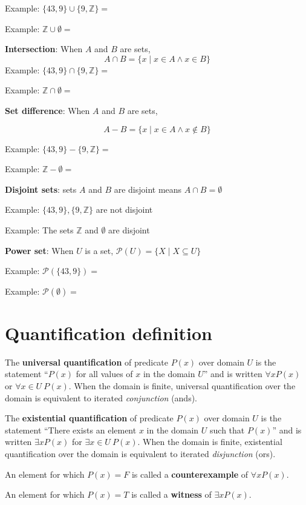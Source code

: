 \documentclass[12pt, oneside]{article}
\begin{document}
Example: $\{43, 9\} \cup \{9, \mathbb{Z}\}  = $

Example: $\mathbb{Z} \cup \emptyset  = $ 

{\bf Intersection}: When $A$ and  $B$ are sets,
\[
    A \cap  B = \{ x \mid x \in A  \wedge x \in B \}
\]    
Example: $\{43, 9\} \cap \{9,\mathbb{Z}\}  = $

Example: $\mathbb{Z} \cap \emptyset  = $


{\bf Set  difference}: When $A$ and  $B$ are sets,

\[
    A -  B = \{ x \mid x \in A  \wedge x \notin B \}
\]

Example: $\{43, 9\} - \{9, \mathbb{Z}\}  = $

Example: $\mathbb{Z} - \emptyset  = $

    
{\bf Disjoint sets}: sets $A$ and  $B$ are disjoint means $A \cap  B  = \emptyset$

Example: $\{43, 9\}, \{9, \mathbb{Z}\}$ are not  disjoint 

Example: The sets $\mathbb{Z}$ and $\emptyset$ are disjoint

    

{\bf Power set}: When $U$ is a set, $\mathcal{P}(U) = \{ X \mid X \subseteq U\}$

Example: $\mathcal{P}(\{43, 9\}) = $

Example: $\mathcal{P}(\emptyset) = $
 \vfill
\section*{Quantification definition}


The {\bf universal quantification} of predicate $P(x)$ over
domain $U$ is the statement ``$P(x)$ for all values of $x$ in the domain $U$''
and is written $\forall x P(x)$ or $\forall x \in U ~P(x)$. 
When the domain is finite, universal quantification over the domain 
is equivalent to iterated {\it conjunction} (ands).

The {\bf existential quantification} of predicate $P(x)$ 
over domain $U$ is the statement ``There exists an element $x$ 
in the domain $U$ such that $P(x)$'' and is written $\exists x P(x)$
for $\exists x \in U ~P(x)$. 
When the domain is finite, existential quantification over the domain 
is equivalent to iterated {\it disjunction} (ors).

An element for which $P(x) = F$ is called a {\bf counterexample} of $\forall x P(x)$.

An element for which $P(x) = T$ is called a {\bf witness} of $\exists x P(x)$.
 \vfill
\end{document}
